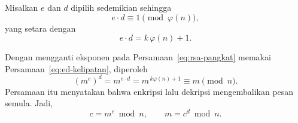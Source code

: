 Misalkan $e$ dan $d$ dipilih sedemikian sehingga
\begin{equation}
e \cdot d \equiv 1 \pmod{\varphi(n)},
\label{eq:ed-kongruen}
\end{equation}
yang setara dengan
\begin{equation}
e \cdot d = k\,\varphi(n) + 1.
\label{eq:ed-kelipatan}
\end{equation}

Dengan mengganti eksponen pada Persamaan~\eqref{eq:rsa-pangkat} memakai
Persamaan~\eqref{eq:ed-kelipatan}, diperoleh
\begin{equation}
(m^e)^d = m^{e \cdot d} = m^{\,k\varphi(n)+1} \equiv m \pmod{n}.
\label{eq:rsa-bukti}
\end{equation}
Persamaan itu menyatakan bahwa enkripsi lalu dekripsi mengembalikan pesan
semula. Jadi,
\begin{equation}
c = m^e \bmod n, \qquad m = c^d \bmod n.
\label{eq:rsa-rumus}
\end{equation}
